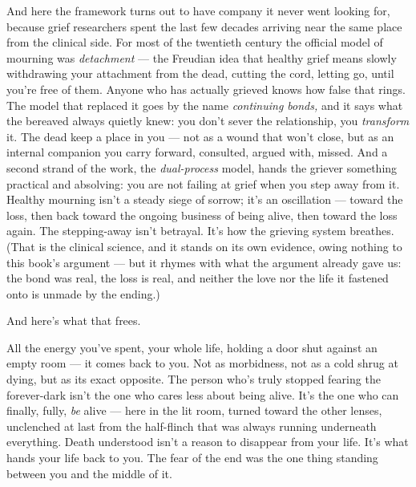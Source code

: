 \documentclass[11pt,openany]{book}
\begin{document}
And here the framework turns out to have company it never went looking for, because grief researchers spent the last few decades arriving near the same place from the clinical side. For most of the twentieth century the official model of mourning was \textit{detachment} — the Freudian idea that healthy grief means slowly withdrawing your attachment from the dead, cutting the cord, letting go, until you’re free of them. Anyone who has actually grieved knows how false that rings. The model that replaced it goes by the name \textit{continuing bonds,} and it says what the bereaved always quietly knew: you don’t sever the relationship, you \textit{transform} it. The dead keep a place in you — not as a wound that won’t close, but as an internal companion you carry forward, consulted, argued with, missed. And a second strand of the work, the \textit{dual-process} model, hands the griever something practical and absolving: you are not failing at grief when you step away from it. Healthy mourning isn’t a steady siege of sorrow; it’s an oscillation — toward the loss, then back toward the ongoing business of being alive, then toward the loss again. The stepping-away isn’t betrayal. It’s how the grieving system breathes. (That is the clinical science, and it stands on its own evidence, owing nothing to this book’s argument — but it rhymes with what the argument already gave us: the bond was real, the loss is real, and neither the love nor the life it fastened onto is unmade by the ending.)

And here’s what that frees.

All the energy you’ve spent, your whole life, holding a door shut against an empty room — it comes back to you. Not as morbidness, not as a cold shrug at dying, but as its exact opposite. The person who’s truly stopped fearing the forever-dark isn’t the one who cares less about being alive. It’s the one who can finally, fully, \textit{be} alive — here in the lit room, turned toward the other lenses, unclenched at last from the half-flinch that was always running underneath everything. Death understood isn’t a reason to disappear from your life. It’s what hands your life back to you. The fear of the end was the one thing standing between you and the middle of it.
\end{document}
